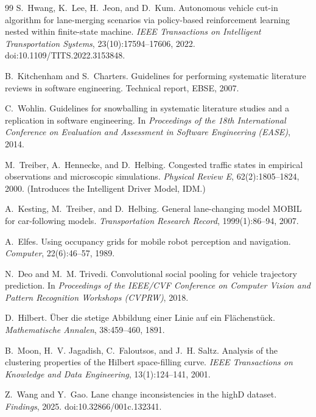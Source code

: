 \documentclass[12pt,a4paper,twoside,openright]{report}
\begin{document}
\begin{thebibliography}{99}
        S.~Hwang, K.~Lee, H.~Jeon, and D.~Kum.
        \newblock Autonomous vehicle cut-in algorithm for lane-merging scenarios via policy-based reinforcement learning nested within finite-state machine.
        \newblock \emph{IEEE Transactions on Intelligent Transportation Systems}, 23(10):17594--17606, 2022.
        \newblock doi:10.1109/TITS.2022.3153848.

        B.~Kitchenham and S.~Charters.
        \newblock Guidelines for performing systematic literature reviews in software engineering.
        \newblock Technical report, EBSE, 2007.

        C.~Wohlin.
        \newblock Guidelines for snowballing in systematic literature studies and a replication in software engineering.
        \newblock In \emph{Proceedings of the 18th International Conference on Evaluation and Assessment in Software Engineering (EASE)}, 2014.

        M.~Treiber, A.~Hennecke, and D.~Helbing.
        \newblock Congested traffic states in empirical observations and microscopic simulations.
        \newblock \emph{Physical Review E}, 62(2):1805--1824, 2000.
        \newblock (Introduces the Intelligent Driver Model, IDM.)

        A.~Kesting, M.~Treiber, and D.~Helbing.
        \newblock General lane-changing model MOBIL for car-following models.
        \newblock \emph{Transportation Research Record}, 1999(1):86--94, 2007.

        A.~Elfes.
        \newblock Using occupancy grids for mobile robot perception and navigation.
        \newblock \emph{Computer}, 22(6):46--57, 1989.

        N.~Deo and M.~M. Trivedi.
        \newblock Convolutional social pooling for vehicle trajectory prediction.
        \newblock In \emph{Proceedings of the IEEE/CVF Conference on Computer Vision and Pattern Recognition Workshops (CVPRW)}, 2018.

        D.~Hilbert.
        \newblock \"Uber die stetige Abbildung einer Linie auf ein Fl\"achenst\"uck.
        \newblock \emph{Mathematische Annalen}, 38:459--460, 1891.

        B.~Moon, H.~V. Jagadish, C.~Faloutsos, and J.~H. Saltz.
        \newblock Analysis of the clustering properties of the Hilbert space-filling curve.
        \newblock \emph{IEEE Transactions on Knowledge and Data Engineering}, 13(1):124--141, 2001.

        Z.~Wang and Y.~Gao.
        \newblock Lane change inconsistencies in the highD dataset.
        \newblock \emph{Findings}, 2025.
        \newblock doi:10.32866/001c.132341.

    \end{thebibliography}
\end{document}
